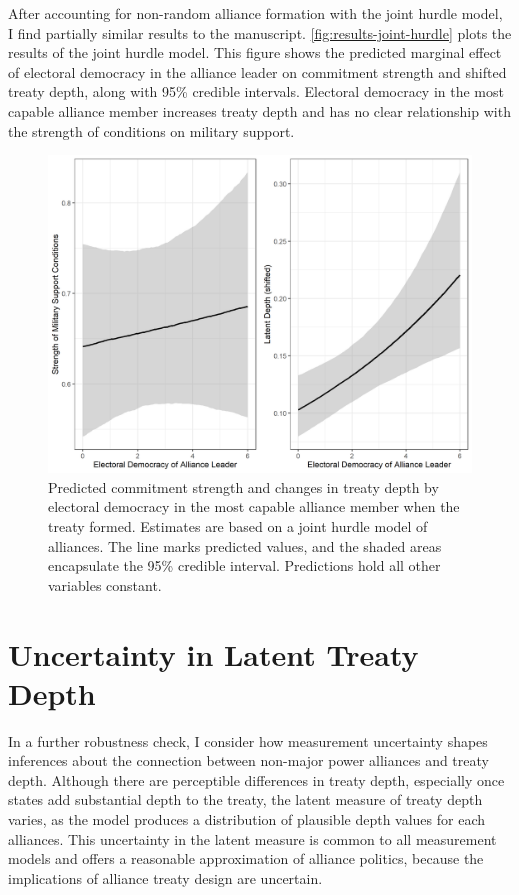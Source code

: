 \documentclass[12pt]{article}
\begin{document}
After accounting for non-random alliance formation with the joint hurdle model, I find partially similar results to the manuscript. 
\autoref{fig:results-joint-hurdle} plots the results of the joint hurdle model. 
This figure shows the predicted marginal effect of electoral democracy in the alliance leader on commitment strength and shifted treaty depth, along with 95\% credible intervals.
Electoral democracy in the most capable alliance member increases treaty depth and has no clear relationship with the strength of conditions on military support. 


\begin{figure}
\includegraphics[width=.95\textwidth]{results-joint-hurdle.png}  
\caption{Predicted commitment strength and changes in treaty depth by electoral democracy in the most capable alliance member when the treaty formed. Estimates are based on a joint hurdle model of alliances. The line marks predicted values, and the shaded areas encapsulate the 95\% credible interval. Predictions hold all other variables constant.}
\label{fig:results-joint-hurdle}
\end{figure}




\section{Uncertainty in Latent Treaty Depth} 


In a further robustness check, I consider how measurement uncertainty shapes inferences about the connection between non-major power alliances and treaty depth. 
Although there are perceptible differences in treaty depth, especially once states add substantial depth to the treaty, the latent measure of treaty depth varies, as the model produces a distribution of plausible depth values for each alliances. 
This uncertainty in the latent measure is common to all measurement models and offers a reasonable approximation of alliance politics, because the implications of alliance treaty design are uncertain.  
\end{document}

